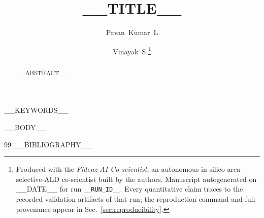 \documentclass[journal]{IEEEtran}
\title{__TITLE__}
\author{Pavan~Kumar~L \and Vinayak~S%
\thanks{Produced with the \emph{Fidenz AI Co-scientist}, an autonomous in-silico
area-selective-ALD co-scientist built by the authors. Manuscript autogenerated on
__DATE__ for run \texttt{__RUN_ID__}. Every quantitative claim traces to the recorded
validation artifacts of that run; the reproduction command and full provenance appear in
Sec.~\ref{sec:reproducibility}.}}
\begin{document}
\maketitle

\begin{abstract}
__ABSTRACT__
\end{abstract}

\begin{IEEEkeywords}
__KEYWORDS__
\end{IEEEkeywords}

__BODY__

\begin{thebibliography}{99}
__BIBLIOGRAPHY__
\end{thebibliography}
\end{document}
